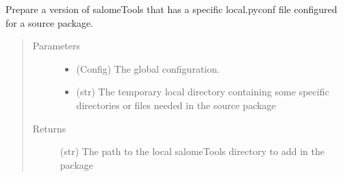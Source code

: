 \documentclass[a4paper,10pt,english]{sphinxmanual}
\begin{document}

\begin{fulllineitems}
\label{\detokenize{apidoc_commands/commands:commands.package.add_salomeTools}}
Prepare a version of salomeTools that has a specific local.pyconf file 
configured for a source package.
\begin{quote}\begin{description}
\item[{Parameters}] \leavevmode\begin{itemize}
\item {} 
 \textendash{} (Config) The global configuration.

\item {} 
 \textendash{} (str) 
The temporary local directory containing some specific directories
or files needed in the source package

\end{itemize}

\item[{Returns}] \leavevmode
(str) 
The path to the local salomeTools directory to add in the package

\end{description}\end{quote}

\end{fulllineitems}

\end{document}
